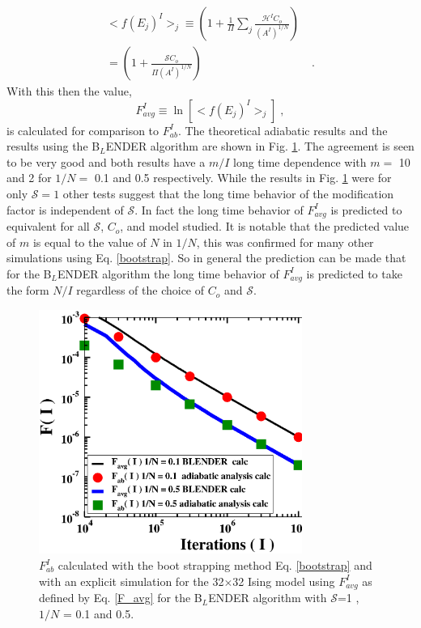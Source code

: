 \documentclass[aps,pre,reprint,superscriptaddress,showkeys]{revtex4-2}
\begin{document}
\begin{equation}
\begin{split}
 <f(E_j)^I>_j  \equiv (1 + \frac{1}{\Pi}\sum_j\frac{\mathcal{H}^IC_o}{(A^I)^{1/N}})\\
 = (1 + \frac{\mathcal{S}C_o}{\Pi(A^I)^{1/N}})& \;.
 \end{split}
 \label{calcmodfactor}
 \end{equation} 
  With this then the value,
 \begin{equation}
  F_{avg}^I\equiv \ln[<f(E_j)^I>_j]\;,
  \label{F_avg}
  \end{equation}
  is  calculated for comparison to $F_{ab}^I$.   The theoretical adiabatic results and the results using the B$_L$ENDER algorithm are shown in Fig. \ref{fcalcs}.   The agreement is seen to be very good and both results have a $m/I$ long time dependence with $m=$ 10 and 2  for $1/N=$ 0.1 and 0.5 respectively. While the results in Fig. \ref{fcalcs} were for only $\mathcal{S}=1$ other tests suggest that the long time behavior of the modification factor is independent of $\mathcal{S}$. In fact the long time behavior of $F_{avg}^I$ is predicted to equivalent for all $\mathcal{S}$, $C_o$,  and model studied.  It is notable that the predicted value of $m$ is equal to the value of $N$ in $1/N$, this was confirmed for many other simulations using Eq. \ref{bootstrap}. So in general the prediction can be made that for the B$_L$ENDER algorithm the long time behavior of $F_{avg}^I$ is predicted to take the form $N/I$ regardless of the choice of $C_o$ and $\mathcal{S}$. 
\begin{figure}
\includegraphics[width=8.6cm]{fig5.eps}
\caption{$F_{ab}^I$ calculated with the boot strapping method Eq. \ref{bootstrap} and with an explicit simulation for the 32$\times$32 Ising model using $F_{avg}^I$ as defined by Eq. \ref{F_avg} for the B$_L$ENDER algorithm with $\mathcal{S}$=1 , $1/N$ = 0.1  and 0.5.            \label{fcalcs}}
\end{figure}
\end{document}
